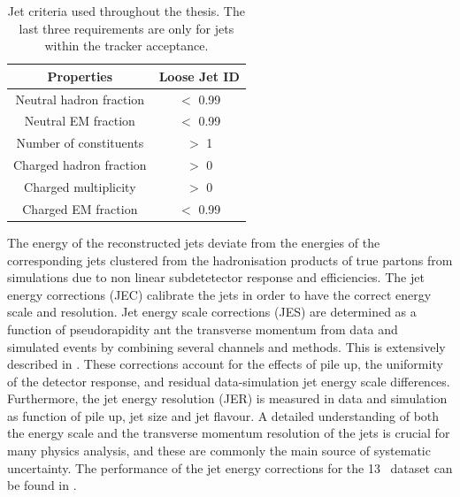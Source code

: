 \begin{table}[h]
	\centering
	\caption{Jet criteria used throughout the thesis. The last three requirements are only for jets within the tracker acceptance.}
	\begin{tabular}{cc}
		\toprule 
		Properties & Loose Jet ID \\ 
		\midrule
		Neutral hadron fraction & $<$ 0.99 \\ 
		
		Neutral EM fraction & $<$ 0.99 \\ 
		
		Number of constituents & $>$ 1 \\ 
		 		
		Charged hadron fraction & $>$ 0 \\ 
	 
		Charged multiplicity & $>$ 0 \\ 
		
		Charged EM fraction & $<$ 0.99 \\ 
		\bottomrule
	\end{tabular} 
	\label{tab:jetID}
\end{table}

The energy of the reconstructed jets deviate from the energies of the corresponding jets clustered from the hadronisation products of true partons from simulations due to non linear subdetetector response and efficiencies. The jet energy corrections (JEC) calibrate the jets in order to have the correct energy scale and resolution.
Jet energy scale corrections (JES) are determined as a function of pseudorapidity ant the transverse momentum from data and simulated events by combining several channels and methods. This is extensively described in \cite{1748-0221-12-02-P02014}. These corrections account for the effects of pile up, the uniformity of the detector response, and residual data-simulation jet energy scale differences. Furthermore, the jet energy resolution (JER) is measured in data and simulation as function of pile up, jet size and jet flavour.  A detailed understanding of both the energy scale and the transverse momentum resolution of the jets is crucial for many physics analysis, and these are commonly the main source of systematic uncertainty. The performance of the jet energy corrections for the 13 \TeV\ dataset can be found in \cite{CMS-DP-2016-020}.


